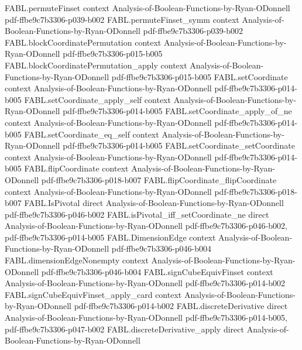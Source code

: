 \begin{theorem}
  {FABL.permuteFinset}
  {context}
  {Analysis-of-Boolean-Functions-by-Ryan-ODonnell}
  {pdf-ffbe9c7b3306-p039-b002}
\proofstep
  {FABL.permuteFinset_symm}
  {context}
  {Analysis-of-Boolean-Functions-by-Ryan-ODonnell}
  {pdf-ffbe9c7b3306-p039-b002}
\proofstep
  {FABL.blockCoordinatePermutation}
  {context}
  {Analysis-of-Boolean-Functions-by-Ryan-ODonnell}
  {pdf-ffbe9c7b3306-p015-b005}
\proofstep
  {FABL.blockCoordinatePermutation_apply}
  {context}
  {Analysis-of-Boolean-Functions-by-Ryan-ODonnell}
  {pdf-ffbe9c7b3306-p015-b005}
\proofstep
  {FABL.setCoordinate}
  {context}
  {Analysis-of-Boolean-Functions-by-Ryan-ODonnell}
  {pdf-ffbe9c7b3306-p014-b005}
\proofstep
  {FABL.setCoordinate_apply_self}
  {context}
  {Analysis-of-Boolean-Functions-by-Ryan-ODonnell}
  {pdf-ffbe9c7b3306-p014-b005}
\proofstep
  {FABL.setCoordinate_apply_of_ne}
  {context}
  {Analysis-of-Boolean-Functions-by-Ryan-ODonnell}
  {pdf-ffbe9c7b3306-p014-b005}
\proofstep
  {FABL.setCoordinate_eq_self}
  {context}
  {Analysis-of-Boolean-Functions-by-Ryan-ODonnell}
  {pdf-ffbe9c7b3306-p014-b005}
\proofstep
  {FABL.setCoordinate_setCoordinate}
  {context}
  {Analysis-of-Boolean-Functions-by-Ryan-ODonnell}
  {pdf-ffbe9c7b3306-p014-b005}
\proofstep
  {FABL.flipCoordinate}
  {context}
  {Analysis-of-Boolean-Functions-by-Ryan-ODonnell}
  {pdf-ffbe9c7b3306-p018-b007}
\proofstep
  {FABL.flipCoordinate_flipCoordinate}
  {context}
  {Analysis-of-Boolean-Functions-by-Ryan-ODonnell}
  {pdf-ffbe9c7b3306-p018-b007}
\proofstep
  {FABL.IsPivotal}
  {direct}
  {Analysis-of-Boolean-Functions-by-Ryan-ODonnell}
  {pdf-ffbe9c7b3306-p046-b002}
\proofstep
  {FABL.isPivotal_iff_setCoordinate_ne}
  {direct}
  {Analysis-of-Boolean-Functions-by-Ryan-ODonnell}
  {pdf-ffbe9c7b3306-p046-b002,
    pdf-ffbe9c7b3306-p014-b005}
\proofstep
  {FABL.DimensionEdge}
  {context}
  {Analysis-of-Boolean-Functions-by-Ryan-ODonnell}
  {pdf-ffbe9c7b3306-p046-b004}
\proofstep
  {FABL.dimensionEdgeNonempty}
  {context}
  {Analysis-of-Boolean-Functions-by-Ryan-ODonnell}
  {pdf-ffbe9c7b3306-p046-b004}
\proofstep
  {FABL.signCubeEquivFinset}
  {context}
  {Analysis-of-Boolean-Functions-by-Ryan-ODonnell}
  {pdf-ffbe9c7b3306-p014-b002}
\proofstep
  {FABL.signCubeEquivFinset_apply_card}
  {context}
  {Analysis-of-Boolean-Functions-by-Ryan-ODonnell}
  {pdf-ffbe9c7b3306-p014-b002}
\proofstep
  {FABL.discreteDerivative}
  {direct}
  {Analysis-of-Boolean-Functions-by-Ryan-ODonnell}
  {pdf-ffbe9c7b3306-p014-b005,
    pdf-ffbe9c7b3306-p047-b002}
\proofstep
  {FABL.discreteDerivative_apply}
  {direct}
  {Analysis-of-Boolean-Functions-by-Ryan-ODonnell}

\end{theorem}

